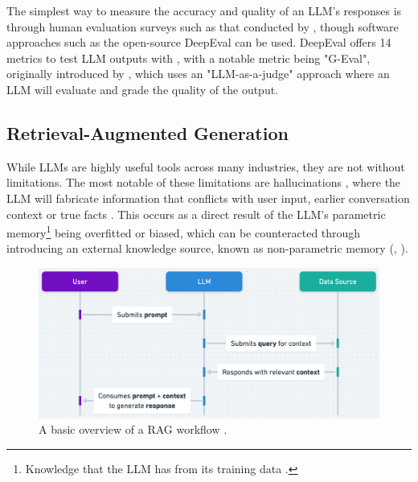 \documentclass[12pt]{report}
\begin{document}
    The simplest way to measure the accuracy and quality of an LLM's responses is through human evaluation surveys such as that conducted by \textcite{ouyang_training_2022}, though
    software approaches such as the open-source DeepEval can be used. DeepEval offers 14 metrics to test LLM outputs with \autocite{deepeval_introduction_2024},
    with a notable metric being "G-Eval", originally introduced by \textcite{liu_g-eval_2023}, which uses an "LLM-as-a-judge" approach where an LLM will evaluate
    and grade the quality of the output.


    \subsection{Retrieval-Augmented Generation}
    
    While LLMs are highly useful tools across many industries, they are not without limitations. The most notable 
    of these limitations are hallucinations \autocite{lewis_retrieval-augmented_2021}, where the LLM will fabricate 
    information that conflicts with user input, earlier conversation context or true facts \autocite{zhang_sirens_2023}. This occurs as a direct result of the LLM's parametric memory\footnote{Knowledge that the LLM has from its training data \autocite{siriwardhana_improving_2023}.}
    being overfitted or biased, which can be counteracted through introducing an external knowledge source, known as non-parametric memory (\textcite{komeili_internet-augmented_2022}, \textcite{siriwardhana_improving_2023}).
    
    \begin{figure}[H] 
        \centering
        \includegraphics[width=.8\linewidth]{RAGProcess.png}
        \caption{A basic overview of a RAG workflow \autocite{openai_retrieval_nodate}.}
        \label{fig:RAGProcess}
    \end{figure}
\end{document}
